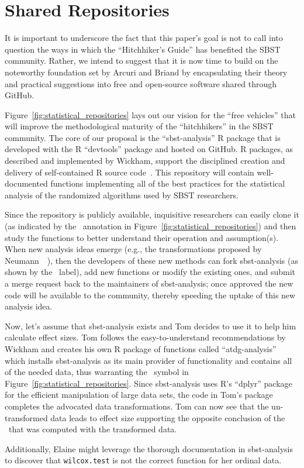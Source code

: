 
\vspace*{-.5em}

\section{Shared Repositories}
\label{sec:repositories}



It is important to underscore the fact that this paper's goal is not to call into question the ways in which the
``Hitchhiker's Guide'' has benefited the SBST community. Rather, we intend to suggest that it is now time to build on
the noteworthy foundation set by Arcuri and Briand by encapsulating their theory and practical suggestions into free and
open-source software shared through GitHub.

Figure~\ref{fig:statistical_repositories} lays out our vision for the ``free vehicles'' that will improve the
methodological maturity of the ``hitchhikers'' in the SBST community. The core of our proposal is the ``sbst-analysis''
R package that is developed with the R ``devtools'' package and hosted on GitHub. R packages, as described and
implemented by Wickham, support the disciplined creation and delivery of self-contained R source
code~\cite{Wickham2015}. This repository will contain well-documented functions implementing all of the best practices
for the statistical analysis of the randomized algorithms used by SBST researchers.

Since the repository is publicly available, inquisitive researchers can easily clone it (as indicated by the
\codecopygit~annotation in Figure~\ref{fig:statistical_repositories}) and then study the functions to better understand
their operation and assumption(s). When new analysis ideas emerge (e.g., the transformations proposed by
Neumann~\etal~\cite{Neumann2015}), then the developers of these new methods can fork sbst-analysis (as shown by the
\codeforkgit~label), add new functions or modify the existing ones, and submit a merge request back to the maintainers
of sbst-analysis; once approved the new code will be available to the community, thereby speeding the uptake of this new
analysis idea.

Now, let's assume that sbst-analysis exists and Tom decides to use it to help him calculate effect sizes. Tom follows
the easy-to-understand recommendations by Wickham and creates his own R package of functions called ``atdg-analysis''
which installs sbst-analysis as its main provider of functionality and contains all of the needed data, thus warranting
the \codedatagit~symbol in Figure~\ref{fig:statistical_repositories}. Since sbst-analysis uses R's ``dplyr'' package for
the efficient manipulation of large data sets, the code in Tom's package completes the advocated data transformations.
Tom can now see that the un-transformed data leads to effect size supporting the opposite conclusion of the
\atwelve~that was computed with the transformed data.

Additionally, Elaine might leverage the thorough documentation in sbst-analysis to discover that {\tt wilcox.test} is
not the correct function for her ordinal data.

